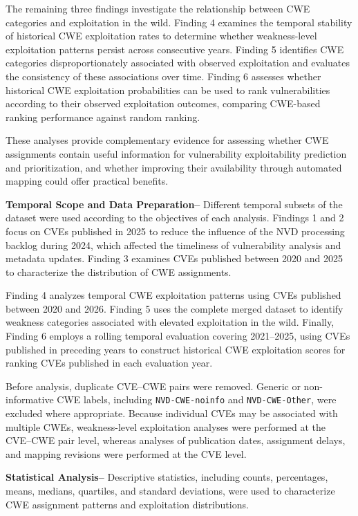 \documentclass[conference,compsoc]{IEEEtran}
\begin{document}
The remaining three findings investigate
the relationship between CWE categories
and exploitation in the wild. Finding 4
examines the temporal stability of
historical CWE exploitation rates to
determine whether weakness-level
exploitation patterns persist across
consecutive years. Finding 5 identifies
CWE categories disproportionately
associated with observed exploitation
and evaluates the consistency of these
associations over time. Finding 6
assesses whether historical CWE
exploitation probabilities can be used
to rank vulnerabilities according to
their observed exploitation outcomes,
comparing CWE-based ranking performance
against random ranking.

These analyses provide complementary
evidence for assessing whether CWE
assignments contain useful information
for vulnerability exploitability
prediction and prioritization, and
whether improving their availability
through automated mapping could
offer practical benefits.

\textbf{Temporal Scope and Data Preparation--}
Different temporal subsets of the
dataset were used according to the
objectives of each analysis. Findings
1 and 2 focus on CVEs published in
2025 to reduce the influence of the
NVD processing backlog during 2024,
which affected the timeliness of
vulnerability analysis and metadata
updates. Finding 3 examines CVEs
published between 2020 and 2025
to characterize the distribution
of CWE assignments.

Finding 4 analyzes temporal CWE
exploitation patterns using CVEs
published between 2020 and 2026.
Finding 5 uses the complete merged
dataset to identify weakness
categories associated with elevated
exploitation in the wild. Finally,
Finding 6 employs a rolling temporal
evaluation covering 2021--2025,
using CVEs published in preceding
years to construct historical CWE
exploitation scores for ranking
CVEs published in each evaluation year.

Before analysis, duplicate CVE--CWE
pairs were removed. Generic or
non-informative CWE labels, including
\texttt{NVD-CWE-noinfo} and
\texttt{NVD-CWE-Other}, were excluded
where appropriate. Because individual
CVEs may be associated with multiple
CWEs, weakness-level exploitation
analyses were performed at the
CVE--CWE pair level, whereas analyses
of publication dates, assignment
delays, and mapping revisions were
performed at the CVE level.

\textbf{Statistical Analysis--}
Descriptive statistics, including
counts, percentages, means, medians,
quartiles, and standard deviations,
were used to characterize CWE
assignment patterns and exploitation
distributions.
\end{document}
